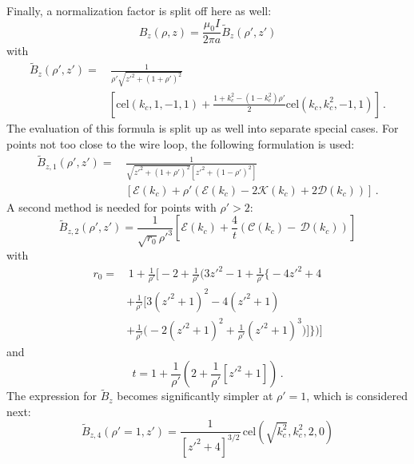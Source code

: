 Finally, a normalization factor is split off here as well:
\begin{equation}
  B_z(\rho, z) = \frac{\mu_0 I}{2 \pi a} \tilde{B}_z(\rho', z')
\end{equation}
with
\begin{align}
  \tilde{B}_z(\rho', z')
  =&\, \frac{1}{\rho' \sqrt{z'^2 + (1 + \rho')^2}} \nonumber \\
 ~& \left[
       \textrm{cel}(k_c, 1, -1, 1)
     + \frac{1 + k_c^2 - \left( 1 - k_c^2 \right) \rho'}{2} \textrm{cel}(k_c, k_c^2, -1, 1)
   \right] \, .
\end{align}
The evaluation of this formula is split up as well into separate special cases.
For points not too close to the wire loop,
the following formulation is used:
\begin{align}
  \tilde{B}_{z,1} (\rho', z')
  =&\, \frac{1}{\sqrt{{z'}^2 + (1+\rho')^2} \left[{z'}^2 + (1 - \rho')^2 \right] } \nonumber \\
  ~&\,  \left[ \mathcal{E}(k_c) + \rho' \left( \mathcal{E}(k_c) - 2 \mathcal{K}(k_c) + 2 \mathcal{D}(k_c) \right) \right] \, .
\end{align}
A second method is needed for points with $\rho' > 2$:
\begin{equation}
  \tilde{B}_{z,2} (\rho', z')
  = \frac{1}{\sqrt{r_0} {\rho'}^3}
    \left[ \mathcal{E}(k_c) + \frac{4}{t} \left( \mathcal{C}(k_c) - \,\mathcal{D}(k_c) \right) \right]
\end{equation}
with
\begin{align}
  r_0
  = &\,             1 + \frac{1}{\rho'} \Biggl[
                  - 2 + \frac{1}{\rho'} \Biggl(
         3 {z'}^2 - 1 + \frac{1}{\rho'} \Biggl\{
       - 4 {z'}^2 + 4 \nonumber \\
  ~& + \frac{1}{\rho'} \Biggl[ 3 \left( {z'}^2 + 1 \right)^2 - 4 \left( {z'}^2 + 1 \right) \nonumber \\
  ~& + \frac{1}{\rho'} \Biggl(-2 \left( {z'}^2 + 1 \right)^2 + \frac{1}{\rho'} \left( {z'}^2 + 1 \right)^3
       \Biggr)
       \Biggr]
       \Biggr\}
       \Biggr)
       \Biggr]
\end{align}
and
\begin{equation}
  t = 1 + \frac{1}{\rho'} \left( 2 + \frac{1}{\rho'} \left[ {z'}^2 + 1 \right] \right) \, .
\end{equation}
The expression for $\tilde{B}_z$ becomes significantly simpler at $\rho'=1$,
which is considered next:
\begin{equation}
  \tilde{B}_{z,4} (\rho'=1, z')
  = \frac{1}{\left[ {z'}^2 + 4 \right]^{3/2}} \,\mathrm{cel}(\sqrt{k_c^2}, k_c^2, 2, 0)
\end{equation}
